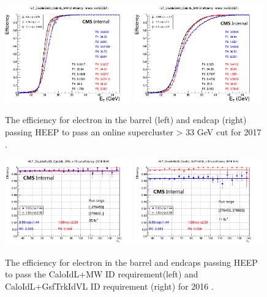 \begin{figure}[h!]
\begin{center}
\includegraphics[width=0.49\textwidth]{figures/Zprime/2017/trigger/eff_DouEle33_Et_barrel.png}
\includegraphics[width=0.49\textwidth]{figures/Zprime/2017/trigger/eff_DouEle33_Et_endcap.png}
\caption{The efficiency for electron in the barrel (left) and endcap (right) passing HEEP to pass an online supercluster \et > 33 GeV cut for 2017 \cite{CMS-AN-2018-021}.}
\label{fig:HLT_turnon_2017}
\end{center}
\end{figure}

\begin{figure}[h!]
\begin{center}
\includegraphics[width=0.49\textwidth]{figures/Zprime/2016/trigger/effMW1_DoubleEle33_SingleElectron_ID_matchedMethod.png}
\includegraphics[width=0.49\textwidth]{figures/Zprime/2016/trigger/eff1_DoubleEle33_SingleElectron_ID_matchedMethod.png}
\caption{The efficiency for electron in the barrel and endcaps passing HEEP to pass the CaloIdL+MW ID requirement(left) and CaloIdL+GsfTrkIdVL ID requirement (right) for 2016 \cite{CMS-AN-2016-404}.}
\label{fig:HLT_ID_2016}
\end{center}
\end{figure}

